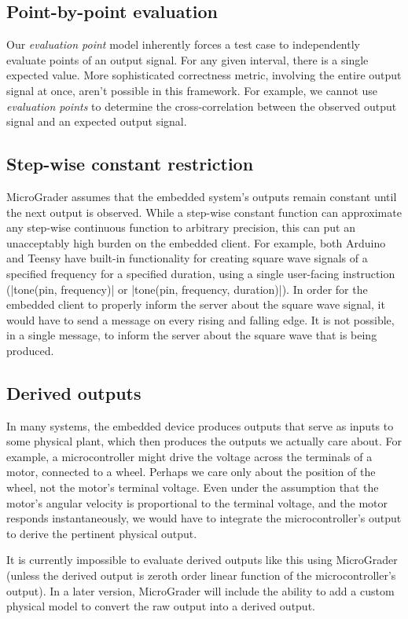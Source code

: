 \documentclass[12pt]{article}
\begin{document}
\subsection{Point-by-point evaluation}
Our \textit{evaluation point} model inherently forces a test case to independently evaluate points of an output signal.  For any given interval, there is a single expected value.   More sophisticated correctness metric, involving the entire output signal at once, aren't possible in this framework.  For example, we cannot use \textit{evaluation points} to determine the cross-correlation between the observed output signal and an expected output signal.

\subsection{Step-wise constant restriction}
MicroGrader assumes that the embedded system's outputs remain constant until the next output is observed.  While a step-wise constant function can approximate any step-wise continuous function to arbitrary precision, this can put an unacceptably high burden on the embedded client.  For example, both Arduino and Teensy have built-in functionality for creating square wave signals of a specified frequency for a specified duration, using a single user-facing instruction (|tone(pin, frequency)| or |tone(pin, frequency, duration)|).  In order for the embedded client to properly inform the server about the square wave signal, it would have to send a message on every rising and falling edge.  It is not possible, in a single message, to inform the server about the square wave that is being produced.

\subsection{Derived outputs}
\label{sec:derived-outputs}
In many systems, the embedded device produces outputs that serve as inputs to some physical plant, which then produces the outputs we actually care about.  For example, a microcontroller might drive the voltage across the terminals of a motor, connected to a wheel.  Perhaps we care only about the position of the wheel, not the motor's terminal voltage.  Even under the assumption that the motor's angular velocity is proportional to the terminal voltage, and the motor responds instantaneously, we would have to integrate the microcontroller's output to derive the pertinent physical output.

It is currently impossible to evaluate derived outputs like this using MicroGrader (unless the derived output is zeroth order linear function of the microcontroller's output).  In a later version, MicroGrader will include the ability to add a custom physical model to convert the raw output into a derived output.
\end{document}

